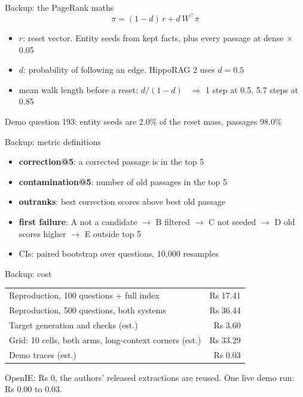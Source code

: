 \documentclass[aspectratio=169,12pt]{beamer}
\newcommand{\quiet}[1]{{\color{muted}\small #1}}
\begin{document}
\begin{frame}{Backup: the PageRank maths}
\[\pi = (1-d)\,r + d\,W^{\top}\pi\]
\begin{itemize}
\item $r$: reset vector. Entity seeds from kept facts, plus every passage at dense $\times$ 0.05
\item $d$: probability of following an edge. HippoRAG 2 uses $d = 0.5$
\item mean walk length before a reset: $d/(1-d)$ \ $\Rightarrow$ 1 step at 0.5, 5.7 steps at 0.85
\end{itemize}
\vspace{0.4em}
\quiet{Demo question 193: entity seeds are 2.0\% of the reset mass, passages 98.0\%}
\end{frame}

\begin{frame}{Backup: metric definitions}
\begin{itemize}
\item \textbf{correction@5}: a corrected passage is in the top 5
\item \textbf{contamination@5}: number of old passages in the top 5
\item \textbf{outranks}: best correction scores above best old passage
\item \textbf{first failure}: A not a candidate $\rightarrow$ B filtered $\rightarrow$ C not seeded $\rightarrow$ D old scores higher $\rightarrow$ E outside top 5
\item CIs: paired bootstrap over questions, 10,000 resamples
\end{itemize}
\end{frame}

\begin{frame}{Backup: cost}
\begin{tabular}{@{}lr@{}}
\toprule
Reproduction, 100 questions + full index & Rs 17.41\\
Reproduction, 500 questions, both systems & Rs 36.44\\
Target generation and checks (est.) & Rs 3.60\\
Grid: 10 cells, both arms, long-context corners (est.) & Rs 33.29\\
Demo traces (est.) & Rs 0.03\\
\bottomrule
\end{tabular}

\vspace{0.8em}
\quiet{OpenIE: Rs 0, the authors' released extractions are reused. One live demo run: Rs 0.00 to 0.03.}
\end{frame}
\end{document}
